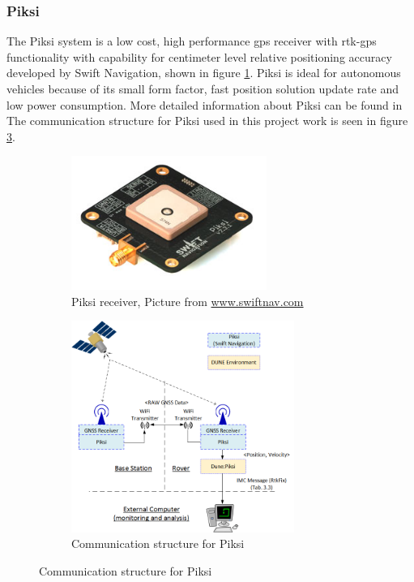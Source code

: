 \subsubsection{Piksi}\label{ss:Piksi}
The Piksi system is a low cost, high performance \gls{gps} receiver with \gls{rtk-gps} functionality with capability for centimeter level relative positioning accuracy developed by Swift Navigation, shown in figure \ref{figure:Piksi}. Piksi is ideal for autonomous vehicles because of its small form factor, fast position solution update rate and low power consumption. 
More detailed information about Piksi can be found in \citep{Piksiv231}
The communication structure for Piksi used in this project work is seen in figure \ref{figure:CommunicationPiksi}.
\begin{figure}[H]
\begin{subfigure}[H]{1\textwidth}
	\centering
		\includegraphics[width=0.7\textwidth]{figs/piksi_top.jpg}
		\caption{Piksi receiver, Picture from \url{www.swiftnav.com}}
		\label{figure:Piksi}
\end{subfigure}

\begin{subfigure}[H]{1\textwidth}
	\centering
		\includegraphics[width=0.8\textwidth]{figs/Piksi.png}
		\caption{Communication structure for Piksi}
		\label{figure:CommunicationPiksi}
\end{subfigure}		
\end{figure}

